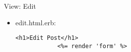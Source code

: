 \begin{frame}{View: Edit}
	\begin{itemize}
		\item \alert{edit.html.erb}:
		\begin{lstlisting}[style=RubyInputStyle, caption=view/posts/edit.html.erb]
			<h1>Edit Post</h1>
			<%= render 'form' %>
		\end{lstlisting}		
	\end{itemize}	
\end{frame}
